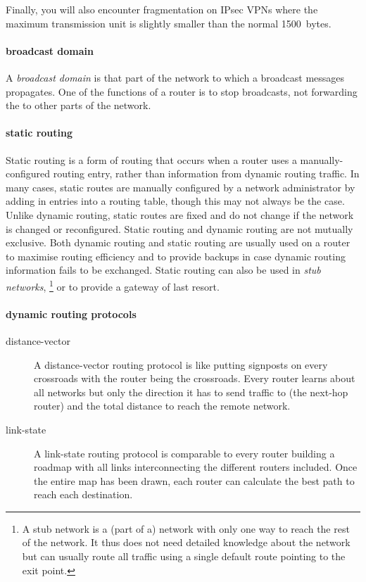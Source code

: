 Finally, you will also encounter fragmentation on IPsec \aclp{VPN} where the maximum transmission unit is slightly smaller than the normal 1500~bytes.

\paragraph{broadcast domain}
A \emph{broadcast domain} is that part of the network to which a broadcast messages propagates.
One of the functions of a router is to stop broadcasts, not forwarding the to other parts of the network.

\paragraph{static routing}
Static routing is a form of routing that occurs when a router uses a manually-configured routing entry, rather than information from dynamic routing traffic.
In many cases, static routes are manually configured by a network administrator by adding in entries into a routing table, though this may not always be the case.
Unlike dynamic routing, static routes are fixed and do not change if the network is changed or reconfigured.
Static routing and dynamic routing are not mutually exclusive.
Both dynamic routing and static routing are usually used on a router to maximise routing efficiency and to provide backups in case dynamic routing information fails to be exchanged.
Static routing can also be used in \emph{stub networks},%
%
\footnote{%
A stub network is a (part of a) network with only one way to reach the rest of the network.
It thus does not need detailed knowledge about the network but can usually route all traffic using a single default route pointing to the exit point.
}
or to provide a gateway of last resort.


\paragraph{dynamic routing protocols}
\begin{description}
\item[distance-vector]
A distance-vector routing protocol is like putting signposts on every crossroads with the router being the crossroads.
Every router learns about all networks but only the direction it has to send traffic to (the next-hop router) and the total distance to reach the remote network.
\item[link-state]
A link-state routing protocol is comparable to every router building a roadmap with all links interconnecting the different routers included.
Once the entire map has been drawn, each router can calculate the best path to reach each destination.
\end{description}


